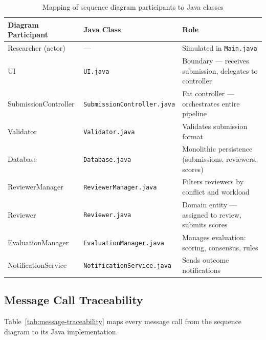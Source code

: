 \documentclass[12pt, a4paper]{article}
\begin{document}
\begin{table}[H]
\centering
\caption{Mapping of sequence diagram participants to Java classes}
\label{tab:participant-mapping}
\begin{tabularx}{\textwidth}{l l X}
    \toprule
    \textbf{Diagram Participant} & \textbf{Java Class} & \textbf{Role} \\
    \midrule
    Researcher (actor) & --- & Simulated in \texttt{Main.java} \\
    UI & \texttt{UI.java} & Boundary --- receives submission, delegates to controller \\
    SubmissionController & \texttt{SubmissionController.java} & Fat controller --- orchestrates entire pipeline \\
    Validator & \texttt{Validator.java} & Validates submission format \\
    Database & \texttt{Database.java} & Monolithic persistence (submissions, reviewers, scores) \\
    ReviewerManager & \texttt{ReviewerManager.java} & Filters reviewers by conflict and workload \\
    Reviewer & \texttt{Reviewer.java} & Domain entity --- assigned to review, submits scores \\
    EvaluationManager & \texttt{EvaluationManager.java} & Manages evaluation: scoring, consensus, rules \\
    NotificationService & \texttt{NotificationService.java} & Sends outcome notifications \\
    \bottomrule
\end{tabularx}
\end{table}

\subsection{Message Call Traceability}

Table~\ref{tab:message-traceability} maps every message call from the sequence diagram to its Java implementation.
\end{document}
